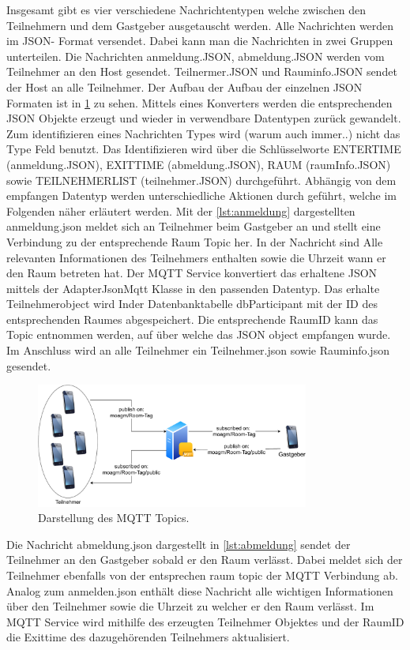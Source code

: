 Insgesamt gibt es vier verschiedene Nachrichtentypen welche zwischen den Teilnehmern und dem Gastgeber ausgetauscht werden. Alle Nachrichten werden im JSON- Format versendet. Dabei kann man die Nachrichten in zwei Gruppen unterteilen. Die Nachrichten anmeldung.JSON, abmeldung.JSON werden vom Teilnehmer an den Host gesendet. Teilnermer.JSON und Rauminfo.JSON sendet der Host an alle Teilnehmer. Der Aufbau der Aufbau der einzelnen JSON Formaten ist in \cref{img:mqtt} zu sehen. Mittels eines Konverters werden die entsprechenden JSON Objekte erzeugt und wieder in verwendbare Datentypen zurück gewandelt. Zum identifizieren eines Nachrichten Types wird (warum auch immer..) nicht das Type Feld benutzt. Das Identifizieren wird über die Schlüsselworte ENTERTIME (anmeldung.JSON), EXITTIME (abmeldung.JSON), RAUM (raumInfo.JSON) sowie TEILNEHMERLIST (teilnehmer.JSON) durchgeführt. Abhängig von dem empfangen Datentyp werden unterschiedliche Aktionen durch geführt, welche im Folgenden näher erläutert werden. 
Mit der \cref{lst:anmeldung} dargestellten anmeldung.json meldet sich an Teilnehmer beim Gastgeber an und stellt eine Verbindung zu der entsprechende Raum Topic her. In der Nachricht sind Alle relevanten Informationen des Teilnehmers enthalten sowie die Uhrzeit wann er den Raum betreten hat. Der MQTT Service konvertiert das erhaltene JSON mittels der AdapterJsonMqtt Klasse in den passenden Datentyp. Das erhalte Teilnehmerobject wird Inder Datenbanktabelle dbParticipant mit der ID des entsprechenden Raumes abgespeichert. Die entsprechende RaumID kann das Topic entnommen werden, auf über welche das JSON object empfangen wurde. Im Anschluss wird an alle Teilnehmer ein Teilnehmer.json sowie Rauminfo.json gesendet.

\begin{figure}
	\centering
	\includegraphics[width =0.8\textwidth]{images/mqttservice.pdf}
	\caption{Darstellung des MQTT Topics.}
	\label{img:mqtt}
\end{figure}

Die Nachricht abmeldung.json dargestellt in \cref{lst:abmeldung}   sendet der Teilnehmer an den Gastgeber sobald er den Raum verlässt. Dabei meldet sich der Teilnehmer ebenfalls von der entsprechen raum topic der MQTT Verbindung ab. Analog zum anmelden.json enthält diese Nachricht alle wichtigen Informationen über den Teilnehmer sowie die Uhrzeit zu welcher er den Raum verlässt. Im MQTT Service wird mithilfe des erzeugten Teilnehmer Objektes und der RaumID die Exittime des dazugehörenden Teilnehmers aktualisiert.  

